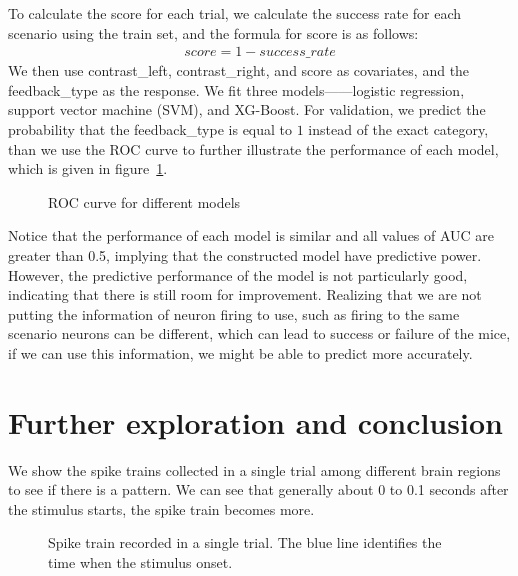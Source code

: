 \documentclass[12pt]{article}
\begin{document}
To calculate the score for each trial, we calculate the success rate for each scenario using the train set, and the formula for score is as follows:
\begin{align}
    score = 1-success\_rate\nonumber
\end{align}
We then use contrast\_left, contrast\_right, and score as covariates, and the feedback\_type as the response. We fit three models——logistic regression, support vector machine (SVM), and XG-Boost. For validation, we predict the probability that the feedback\_type is equal to $1$ instead of the exact category, than we use the ROC curve to further illustrate the performance of each model, which is given in figure~\ref{fig:ROC}.
\begin{figure}[H]
  \centering
  \caption{ROC curve for different models}
  \label{fig:ROC}
\end{figure}
Notice that the performance of each model is similar and all values of AUC are greater than 0.5, implying that the constructed model have predictive power. However, the predictive performance of the model is not particularly good, indicating that there is still room for improvement. Realizing that we are not putting the information of neuron firing to use, such as firing to the same scenario neurons can be different, which can lead to success or failure of the mice, if we can use this information, we might be able to predict more accurately.


\section{Further exploration and conclusion}
We show the spike trains collected in a single trial among different brain regions to see if there is a pattern. We can see that generally about 0 to 0.1 seconds after the stimulus starts, the spike train becomes more.

\begin{figure}[H]
  \centering
  \caption{Spike train recorded in a single trial. The blue line identifies the time when the stimulus onset.}
\end{figure}
\end{document}
